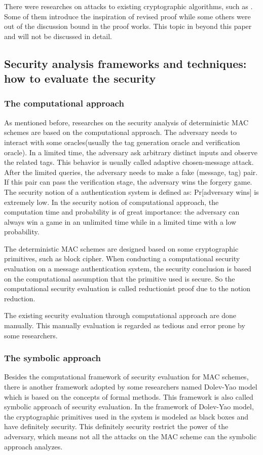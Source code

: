 \documentclass{article}
\begin{document}
There were researches on attacks to existing cryptographic algorithms, such as
\cite{cycle,attack_blk,hardware_attack}. Some of them introduce the inspiration of revised proof while
some others were out of the discussion bound in the proof works. This topic in
beyond this paper and will not be discussed in detail.

\subsection{Security analysis frameworks and techniques: how to evaluate the security}
\subsubsection{The computational approach}
As mentioned before, researches on the security analysis of deterministic MAC schemes are based on the computational approach.
The adversary needs to interact with some oracles(usually the tag generation oracle and verification oracle). In a limited time, the adversary ask arbitrary distinct inputs and observe the related tags. This behavior is usually called adaptive chosen-message attack. After the limited queries, the adversary needs to make a fake (message, tag) pair. If this pair can pass the verification stage, the adversary wins the forgery game. The security notion of a authentication system is defined as: Pr[adversary wins] is extremely low.  In the security notion of computational approach, the computation time and probability is of great importance: the adversary can always win a game in an unlimited time while in a limited time with a low probability. 

The deterministic MAC schemes are designed based on some cryptographic primitives, such as block cipher. When conducting a computational security evaluation on a message authentication system, the security conclusion is based on the computational assumption that the primitive used is secure. So the computational security evaluation is called reductionist proof due to the notion reduction.

The existing security evaluation through computational approach are done manually. This manually evaluation is regarded as tedious and error prone by some researchers. 
\subsubsection{The symbolic approach}
Besides the computational framework of security evaluation for MAC schemes, there is another framework adopted by some researchers named Dolev-Yao model which is based on the concepts of formal methods. This framework is also called symbolic approach of security evaluation.
In the framework of Dolev-Yao model, the cryptographic primitives used in the system is modeled as black boxes and have definitely security. 
This definitely security restrict the power of the adversary, which means not all the attacks on the MAC scheme can the symbolic approach analyzes.  
\end{document}
